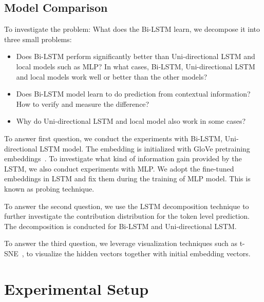 \documentclass{article}
\begin{document}
\subsection{Model Comparison}

To investigate the problem: What does the Bi-LSTM learn, we decompose it into three small problems:

\begin{itemize}
	\item Does Bi-LSTM perform significantly better than Uni-directional LSTM and local models such as MLP? 
	In what cases, Bi-LSTM, Uni-directional LSTM and local models work well or better than the other models?
	\item Does Bi-LSTM model learn to do prediction from contextual information? How to verify and measure the difference?
	\item Why do Uni-directional LSTM and local model also work in some cases? 
\end{itemize}

To answer first question, we conduct the experiments with Bi-LSTM, Uni-directional LSTM model. The embedding is initialized with GloVe pretraining embeddings~\cite{pennington2014glove}. To investigate what kind of information gain provided by the LSTM, we also conduct experiments with MLP. We adopt the fine-tuned embeddings in LSTM and fix them during the training of MLP model. This is known as probing technique. 

To answer the second question, we use the LSTM decomposition technique to further investigate the contribution distribution for the token level prediction. The decomposition is conducted for Bi-LSTM and Uni-directional LSTM. 

To answer the third question, we leverage visualization techniques such as t-SNE~\cite{maaten2008visualizing}, to visualize the hidden vectors together with initial embedding vectors.


\section{Experimental Setup}

\end{document}
